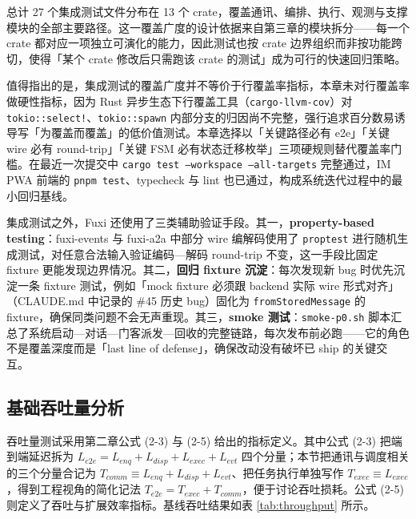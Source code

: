 总计 27 个集成测试文件分布在 13 个 crate，覆盖通讯、编排、执行、观测与支撑模块的全部主要路径。这一覆盖广度的设计依据来自第三章的模块拆分——每一个 crate 都对应一项独立可演化的能力，因此测试也按 crate 边界组织而非按功能跨切，使得「某个 crate 修改后只需跑该 crate 的测试」成为可行的快速回归策略。

值得指出的是，集成测试的覆盖广度并不等价于行覆盖率指标，本章未对行覆盖率做硬性指标，因为 Rust 异步生态下行覆盖工具（\texttt{cargo-llvm-cov}）对 \texttt{tokio::select!}、\texttt{tokio::spawn} 内部分支的归因尚不完整，强行追求百分数易诱导写「为覆盖而覆盖」的低价值测试。本章选择以「关键路径必有 e2e」「关键 wire 必有 round-trip」「关键 FSM 必有状态迁移枚举」三项硬规则替代覆盖率门槛。在最近一次提交中 \texttt{cargo test --workspace --all-targets} 完整通过，IM PWA 前端的 \texttt{pnpm test}、typecheck 与 lint 也已通过，构成系统迭代过程中的最小回归基线。

集成测试之外，Fuxi 还使用了三类辅助验证手段。其一，\textbf{property-based testing}：fuxi-events 与 fuxi-a2a 中部分 wire 编解码使用了 \texttt{proptest} 进行随机生成测试，对任意合法输入验证编码—解码 round-trip 不变，这一手段比固定 fixture 更能发现边界情况。其二，\textbf{回归 fixture 沉淀}：每次发现新 bug 时优先沉淀一条 fixture 测试，例如「mock fixture 必须跟 backend 实际 wire 形式对齐」（CLAUDE.md 中记录的 \#45 历史 bug）固化为 \texttt{fromStoredMessage} 的 fixture，确保同类问题不会无声重现。其三，\textbf{smoke 测试}：\texttt{smoke-p0.sh} 脚本汇总了系统启动—对话—门客派发—回收的完整链路，每次发布前必跑——它的角色不是覆盖深度而是「last line of defense」，确保改动没有破坏已 ship 的关键交互。

\subsection{基础吞吐量分析}

吞吐量测试采用第二章公式 (2-3) 与 (2-5) 给出的指标定义。其中公式 (2-3) 把端到端延迟拆为 $L_{e2e}=L_{enq}+L_{disp}+L_{exec}+L_{evt}$ 四个分量；本节把通讯与调度相关的三个分量合记为 $T_{comm}\equiv L_{enq}+L_{disp}+L_{evt}$、把任务执行单独写作 $T_{exec}\equiv L_{exec}$，得到工程视角的简化记法 $T_{e2e}=T_{exec}+T_{comm}$，便于讨论吞吐损耗。公式 (2-5) 则定义了吞吐与扩展效率指标。基线吞吐结果如表 \ref{tab:throughput} 所示。

